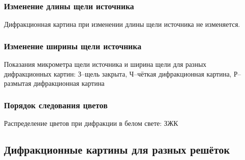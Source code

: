 \subsubsection{Изменение длины щели источника}
Дифракционная картина при изменении длины щели источника не изменяется. 

\subsubsection{Изменение ширины щели источника}

\begin{table}[H]
	    \caption{Показания микрометра щели источника и ширина щели для разных дифракционных картин: З--щель закрыта, Ч--чёткая дифракционная картина, Р--размытая дифракционная картина}
	    \label{tab:chem1}

	\mytable
	
\end{table}

\subsubsection{Порядок следования цветов}
Распределение цветов при дифракции в белом свете: ЗЖК













\subsection{Дифракционные картины для разных решёток}
